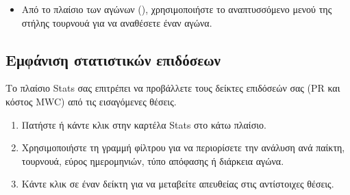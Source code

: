\documentclass[letterpaper,10pt,greek]{sphinxmanual}
\begin{document}
\sphinxAtStartPar
{}
\begin{itemize}
\item {} 
\sphinxAtStartPar
Από το πλαίσιο των αγώνων (), χρησιμοποιήστε το αναπτυσσόμενο μενού της στήλης τουρνουά για να αναθέσετε έναν αγώνα.

\end{itemize}


\subsection{Εμφάνιση στατιστικών επιδόσεων}
\label{\detokenize{guide_utilisateur:afficher-les-statistiques-de-performance}}
\sphinxAtStartPar
Το πλαίσιο Stats σας επιτρέπει να προβάλλετε τους δείκτες επιδόσεών σας (PR και κόστος MWC) από τις εισαγόμενες θέσεις.
\begin{enumerate}
%
\item {} 
\sphinxAtStartPar
Πατήστε  ή κάντε κλικ στην καρτέλα Stats στο κάτω πλαίσιο.

\item {} 
\sphinxAtStartPar
Χρησιμοποιήστε τη γραμμή φίλτρου για να περιορίσετε την ανάλυση ανά παίκτη, τουρνουά, εύρος ημερομηνιών, τύπο απόφασης ή διάρκεια αγώνα.

\item {} 
\sphinxAtStartPar
Κάντε κλικ σε έναν δείκτη για να μεταβείτε απευθείας στις αντίστοιχες θέσεις.

\end{enumerate}
\end{document}
